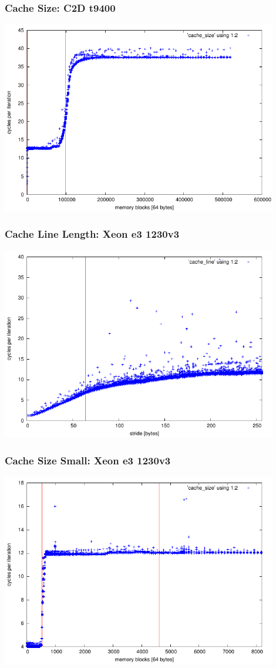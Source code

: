 \documentclass{beamer}
\begin{document}
\begin{frame}[fragile]
	\frametitle{Cache Size: C2D t9400}
	\includegraphics[width=0.9\textwidth]{../c2d_t9400/cache_size_all.pdf}
\end{frame}


\begin{frame}[fragile]
	\frametitle{Cache Line Length: Xeon e3 1230v3}
	\includegraphics[width=0.9\textwidth]{../xeon_e3_1230v3/cache_line.pdf}
\end{frame}

\begin{frame}[fragile]
	\frametitle{Cache Size Small: Xeon e3 1230v3}
	\includegraphics[width=0.9\textwidth]{../xeon_e3_1230v3/cache_size_small.pdf}
\end{frame}
\end{document}
